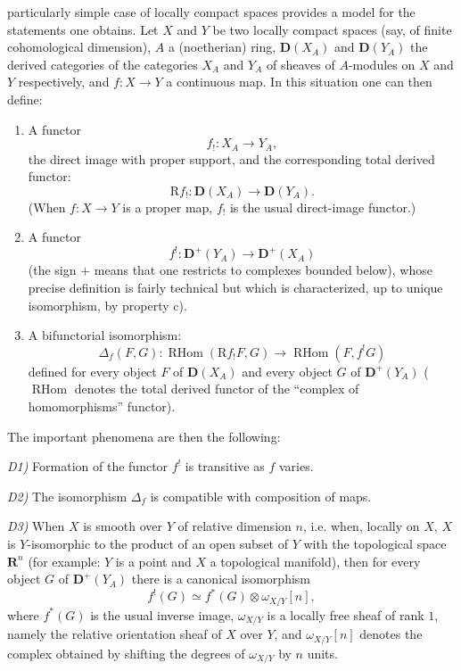 %
particularly simple case of locally compact spaces provides a model for the
statements one obtains. Let $X$ and $Y$ be two locally compact spaces (say,
of finite cohomological dimension), $A$ a (noetherian) ring,
$\mathbf D(X_A)$ and $\mathbf D(Y_A)$ the derived categories of the
categories $X_A$ and $Y_A$ of sheaves of $A$-modules on $X$ and $Y$
respectively, and $f\colon X\longrightarrow Y$ a continuous map. In this
situation one can then define:

\begin{enumerate}
\renewcommand{\labelenumi}{\alph{enumi})}
\item A functor
\[
f_!\colon X_A\longrightarrow Y_A,
\]
the direct image with proper support, and the corresponding total derived
functor:
\[
\mathrm Rf_!\colon \mathbf D(X_A)\longrightarrow \mathbf D(Y_A).
\]
(When $f\colon X\longrightarrow Y$ is a proper map, $f_!$ is the usual
direct-image functor.)

\item A functor
\[
f^!\colon \mathbf D^+(Y_A)\longrightarrow \mathbf D^+(X_A)
\]
(the sign $+$ means that one restricts to complexes bounded below), whose
precise definition is fairly technical but which is characterized, up to
unique isomorphism, by property c).

\item A bifunctorial isomorphism:
\[
\Delta_f(F,G)\colon
\operatorname{RHom}(\mathrm Rf_!F,G)
\longrightarrow
\operatorname{RHom}(F,f^!G)
\]
defined for every object $F$ of $\mathbf D(X_A)$ and every object $G$ of
$\mathbf D^+(Y_A)$ ($\operatorname{RHom}$ denotes the total derived functor
of the “complex of homomorphisms” functor).
\end{enumerate}

The important phenomena are then the following:

\noindent\textit{D1)} Formation of the functor $f^!$ is transitive as $f$
varies.

\noindent\textit{D2)} The isomorphism $\Delta_f$ is compatible with
composition of maps.

\noindent\textit{D3)} When $X$ is smooth over $Y$ of relative dimension
$n$, i.e. when, locally on $X$, $X$ is $Y$-isomorphic to the product of an
open subset of $Y$ with the topological space $\mathbf R^n$ (for example:
$Y$ is a point and $X$ a topological manifold), then for every object $G$ of
$\mathbf D^+(Y_A)$ there is a canonical isomorphism
\[
f^!(G)\simeq f^*(G)\otimes\omega_{X/Y}[n],
\]
where $f^*(G)$ is the usual inverse image, $\omega_{X/Y}$ is a locally free
sheaf of rank $1$, namely the relative orientation sheaf of $X$ over $Y$,
and $\omega_{X/Y}[n]$ denotes the complex obtained by shifting the degrees of
$\omega_{X/Y}$ by $n$ units.
